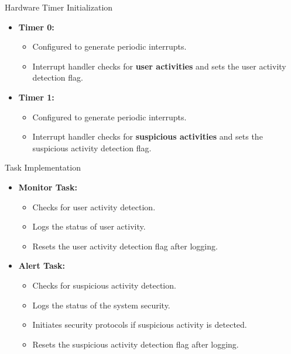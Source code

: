 \begin{frame}{Hardware Timer Initialization}
    \begin{itemize}
        \item \textbf{Timer 0:}
            \begin{itemize}
                \item Configured to generate periodic interrupts.
                \item Interrupt handler checks for \textbf{user activities} and sets the user activity detection flag.
            \end{itemize}
        \item \textbf{Timer 1:}
            \begin{itemize}
                \item Configured to generate periodic interrupts.
                \item Interrupt handler checks for \textbf{suspicious activities} and sets the suspicious activity detection flag.
            \end{itemize}
    \end{itemize}
\end{frame}

\begin{frame}{Task Implementation}
    \begin{itemize}
        \item \textbf{Monitor Task:}
            \begin{itemize}
                \item Checks for user activity detection.
                \item Logs the status of user activity.
                \item Resets the user activity detection flag after logging.
            \end{itemize}
        \item \textbf{Alert Task:}
            \begin{itemize}
                \item Checks for suspicious activity detection.
                \item Logs the status of the system security.
                \item Initiates security protocols if suspicious activity is detected.
                \item Resets the suspicious activity detection flag after logging.
            \end{itemize}
    \end{itemize}
\end{frame}

